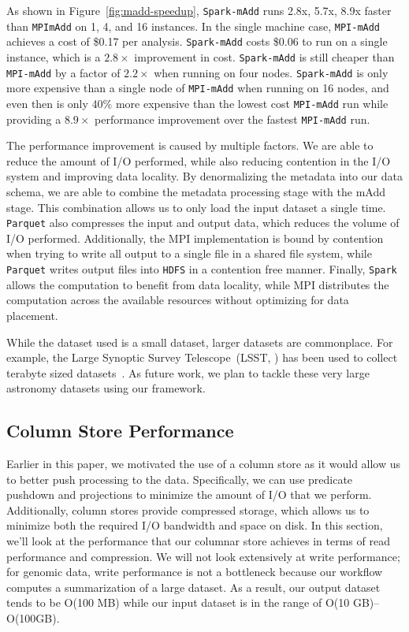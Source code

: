 \documentclass{sig-alternate}
\begin{document}
As shown in Figure~\ref{fig:madd-speedup}, \texttt{Spark-mAdd} runs 2.8x, 5.7x, 8.9x faster than
\texttt{MPImAdd} on 1, 4, and 16 instances. In the single machine case, \texttt{MPI-mAdd} achieves a cost of \$0.17 per
analysis. \texttt{Spark-mAdd} costs \$0.06 to run on a single instance, which is a $2.8\times$ improvement in
cost. \texttt{Spark-mAdd} is still cheaper than \texttt{MPI-mAdd} by a factor of $2.2\times$ when running on four
nodes. \texttt{Spark-mAdd} is only more expensive than a single node of \texttt{MPI-mAdd} when running on 16
nodes, and even then is only 40\% more expensive than the lowest cost \texttt{MPI-mAdd} run while providing a
$8.9\times$ performance improvement over the fastest \texttt{MPI-mAdd} run.

The performance improvement is caused by multiple factors. We are able to reduce the amount of I/O performed,
while also reducing contention in the I/O system and improving data locality. By denormalizing the metadata into
our data schema, we are able to combine the metadata processing stage with the mAdd stage. This combination
allows us to only load the input dataset a single time. \texttt{Parquet} also compresses the input and output data, which
reduces the volume of I/O performed. Additionally, the MPI implementation is bound by contention when trying to write
all output to a single file in a shared file system, while \texttt{Parquet} writes output files into \texttt{HDFS} in a
contention free manner. Finally, \texttt{Spark} allows the computation to benefit from data locality, while MPI distributes
the computation across the available resources without optimizing for data placement.

While the dataset used is a small dataset, larger datasets are commonplace. For example, the Large Synoptic
Survey Telescope~(LSST, \cite{lsst2008}) has been used to collect terabyte sized datasets~\cite{moyers13}. As
future work, we plan to tackle these very large astronomy datasets using our framework.

\subsection{Column Store Performance}
\label{sec:column-store-perf}

Earlier in this paper, we motivated the use of a column store as it would allow us to better push processing to
the data. Specifically, we can use predicate pushdown and projections to minimize the amount of I/O that we
perform. Additionally, column stores provide compressed storage, which allows us to minimize both the required
I/O bandwidth and space on disk. In this section, we'll look at the performance that our columnar store achieves
in terms of read performance and compression. We will not look extensively at write performance; for genomic
data, write performance is not a bottleneck because our workflow computes a summarization of a large
dataset. As a result, our output dataset tends to be O(100 MB) while our input dataset is in the range of
O(10 GB)--O(100GB).
\end{document}

